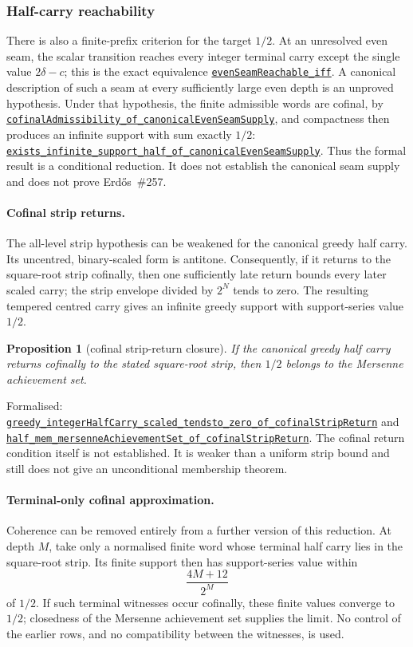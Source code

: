 \documentclass[11pt]{article}
\newcommand{\commit}{81150c1c6fdd4cd51e76d3aa0de344341e0e9e7c}
\newcommand{\repobase}{https://github.com/wcook04/plectis-lean-erdos249-257/blob/\commit}
\newcommand{\PK}{Erdos249257}
\newcommand{\lref}[3]{\href{\repobase/\PK/#1\#L#2}{\nolinkurl{#3}}}
\newcommand{\lrefx}[3]{\href{\repobase/\PK/#1\#L#2}{\nolinkurl{#3}}}
\newtheorem{proposition}[theorem]{Proposition}
\theoremstyle{definition}
\theoremstyle{remark}
\begin{document}
\subsubsection{Half-carry reachability}\label{res:halfcarryreachability}

There is also a finite-prefix criterion for the target $1/2$.  At an unresolved
even seam, the scalar transition reaches every integer terminal carry except
the single value $2\delta-c$; this is the exact equivalence
\lref{HalfCarryReachability.lean}{235}{evenSeamReachable_iff}.  A canonical
description of such a seam at every sufficiently large even depth is an
unproved hypothesis.  Under that hypothesis, the finite admissible words are
cofinal, by
\lrefx{HalfCarryReachability.lean}{999}{cofinalAdmissibility_of_canonicalEvenSeamSupply},
and compactness then produces an infinite support with sum exactly $1/2$:
\lrefx{HalfCarryReachability.lean}{1027}{exists_infinite_support_half_of_canonicalEvenSeamSupply}.
Thus the formal result is a conditional reduction.  It does not establish the
canonical seam supply and does not prove Erd\H{o}s~\#257.

\paragraph{Cofinal strip returns.}  The all-level strip hypothesis can be
weakened for the canonical greedy half carry.  Its uncentred, binary-scaled
form is antitone.  Consequently, if it returns to the square-root strip
cofinally, then one sufficiently late return bounds every later scaled carry;
the strip envelope divided by $2^N$ tends to zero.  The resulting tempered
centred carry gives an infinite greedy support with support-series value
$1/2$.

\begin{proposition}[cofinal strip-return closure]\label{res:cofinalstripreturn}
If the canonical greedy half carry returns cofinally to the stated
square-root strip, then $1/2$ belongs to the Mersenne achievement set.
\end{proposition}
\noindent Formalised:
\lref{CofinalStripReturn.lean}{84}{greedy_integerHalfCarry_scaled_tendsto_zero_of_cofinalStripReturn}
and
\lref{CofinalStripReturn.lean}{157}{half_mem_mersenneAchievementSet_of_cofinalStripReturn}.
The cofinal return condition itself is not established.  It is weaker than a
uniform strip bound and still does not give an unconditional membership
theorem.

\paragraph{Terminal-only cofinal approximation.}  Coherence can be removed
entirely from a further version of this reduction.  At depth $M$, take only a
normalised finite word whose terminal half carry lies in the square-root
strip.  Its finite support then has support-series value within
\[
 \frac{4M+12}{2^M}
\]
of $1/2$.  If such terminal witnesses occur cofinally, these finite values
converge to $1/2$; closedness of the Mersenne achievement set supplies the
limit.  No control of the earlier rows, and no compatibility between the
witnesses, is used.
\end{document}
